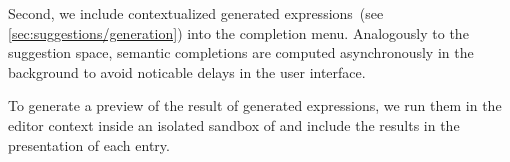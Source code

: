 Second, we include contextualized generated expressions~(see \cref{sec:suggestions/generation}) into the completion menu.
Analogously to the suggestion space, semantic completions are computed asynchronously in the background to avoid noticable delays in the user interface.

To generate a preview of the result of generated expressions, we run them in the editor context inside an isolated sandbox of  and include the results in the presentation of each entry.
